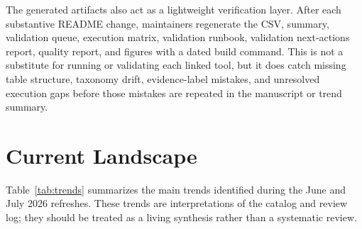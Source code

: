 \documentclass[11pt]{article}
\begin{document}
The generated artifacts also act as a lightweight verification layer. After each substantive README change, maintainers regenerate the CSV, summary, validation queue, execution matrix, validation runbook, validation next-actions report, quality report, and figures with a dated build command. This is not a substitute for running or validating each linked tool, but it does catch missing table structure, taxonomy drift, evidence-label mistakes, and unresolved execution gaps before those mistakes are repeated in the manuscript or trend summary.

\section{Current Landscape}

Table~\ref{tab:trends} summarizes the main trends identified during the June and July 2026 refreshes. These trends are interpretations of the catalog and review log; they should be treated as a living synthesis rather than a systematic review.
\end{document}
